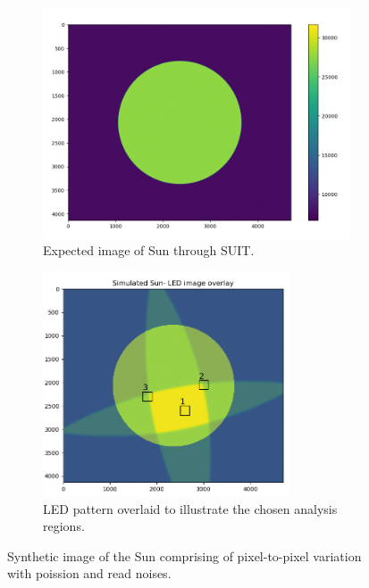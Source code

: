 \documentclass[11pt,a4paper]{article}
\begin{document}
	\begin{figure}
		\begin{subfigure}[b]{0.49\textwidth}
			\centering
			\includegraphics[width=\textwidth]{pics/synthetic_sun}
			\caption{Expected image of Sun through SUIT.}
			\label{fig:syntheticsun}
		\end{subfigure}
	\hfill
		\begin{subfigure}[b]{0.48\textwidth}
	\centering
	\includegraphics[width=0.8\textwidth]{pics/sun_Locations.png}
	\caption{LED pattern overlaid to illustrate the chosen analysis regions.}
	\label{fig:sunlocations}
	\end{subfigure}
	\caption{Synthetic image of the Sun comprising of pixel-to-pixel variation with poission and read noises.}
	\end{figure}
	
\end{document}
